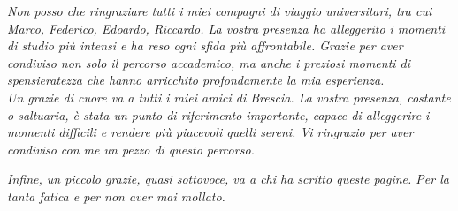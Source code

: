\;

\emph{Non posso che ringraziare tutti i miei compagni di viaggio universitari, tra
cui Marco, Federico, Edoardo, Riccardo. La vostra presenza ha alleggerito i momenti
di studio più intensi e ha reso ogni sfida più affrontabile. Grazie per aver
condiviso non solo il percorso accademico, ma anche i preziosi momenti di spensieratezza
che hanno arricchito profondamente la mia esperienza.
\noindent
\\ Un grazie di cuore va a tutti i miei amici di Brescia. La vostra presenza,
costante o saltuaria, è stata un punto di riferimento importante, capace di
alleggerire i momenti difficili e rendere più piacevoli quelli sereni. Vi ringrazio
per aver condiviso con me un pezzo di questo percorso. }

\vspace{2em}

\emph{Infine, un piccolo grazie, quasi sottovoce, va a chi ha scritto queste pagine.
Per la tanta fatica e per non aver mai mollato.}